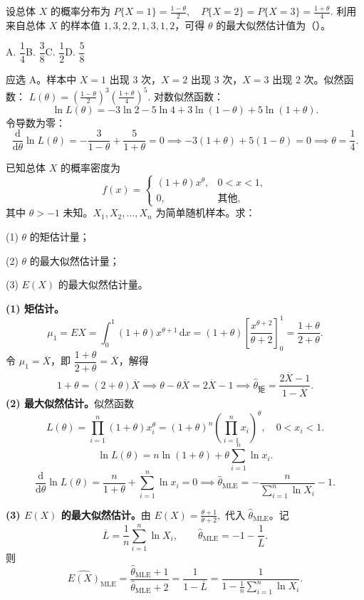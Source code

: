 \documentclass[lang=cn,11pt]{elegantbook}
\begin{document}
\begin{exercise}[离散分布的最大似然估计] \label{ex:mle_01}
设总体 \(X\) 的概率分布为
\(
P\{X=1\}=\frac{1-\theta}{2},\quad P\{X=2\}=P\{X=3\}=\frac{1+\theta}{4}.
\)
利用来自总体 \(X\) 的样本值 \(1,3,2,2,1,3,1,2\)，可得 \(\theta\) 的最大似然估计值为（\quad）。\par
A. \(\dfrac{1}{4}\)\qquad B. \(\dfrac{3}{8}\)\qquad C. \(\dfrac{1}{2}\)\qquad D. \(\dfrac{5}{8}\)
\end{exercise}
\begin{solution}
应选 A。样本中 \(X=1\) 出现 3 次，\(X=2\) 出现 3 次，\(X=3\) 出现 2 次。似然函数：
\(
L(\theta)=\left(\frac{1-\theta}{2}\right)^{\!3}\left(\frac{1+\theta}{4}\right)^{\!5}.
\)
对数似然函数：
\[
\ln L(\theta)=-3\ln 2-5\ln 4+3\ln(1-\theta)+5\ln(1+\theta).
\]
令导数为零：
\[
\frac{\mathrm{d}}{\mathrm{d}\theta}\ln L(\theta)=-\frac{3}{1-\theta}+\frac{5}{1+\theta}=0
\implies -3(1+\theta)+5(1-\theta)=0
\implies \theta=\frac{1}{4}.
\]
\end{solution}

\begin{exercise}[矩估计与最大似然估计]\label{ex:est_02}\label{exer:src-2017-201207-a-08-34credit}
已知总体 \(X\) 的概率密度为
\[
f(x)=
\begin{cases}
(1+\theta)x^\theta, & 0<x<1,\\
0, & \text{其他},
\end{cases}
\]
其中 \(\theta>-1\) 未知。\(X_1,X_2,\dots,X_n\) 为简单随机样本。求：\par
(1) \(\theta\) 的矩估计量；\par
(2) \(\theta\) 的最大似然估计量；\par
(3) \(E(X)\) 的最大似然估计量。
\end{exercise}
\begin{solution}
\textbf{(1) 矩估计。}
\[
\mu_1=EX=\int_0^1(1+\theta)x^{\theta+1}\,\mathrm{d}x=(1+\theta)\left[\frac{x^{\theta+2}}{\theta+2}\right]_0^1=\frac{1+\theta}{2+\theta}.
\]
令 \(\mu_1=\overline{X}\)，即 \(\dfrac{1+\theta}{2+\theta}=\overline{X}\)，解得
\[
1+\theta=(2+\theta)\overline{X}\implies \theta-\theta\overline{X}=2\overline{X}-1\implies \hat{\theta}_{\text{矩}}=\frac{2\overline{X}-1}{1-\overline{X}}.
\]
\textbf{(2) 最大似然估计。}似然函数
\[
L(\theta)=\prod_{i=1}^{n}(1+\theta)x_i^\theta=(1+\theta)^n\left(\prod_{i=1}^{n}x_i\right)^{\!\theta},\quad 0<x_i<1.
\]
\[
\ln L(\theta)=n\ln(1+\theta)+\theta\sum_{i=1}^{n}\ln x_i.
\]
\[
\frac{\mathrm{d}}{\mathrm{d}\theta}\ln L(\theta)=\frac{n}{1+\theta}+\sum_{i=1}^{n}\ln x_i=0
\implies \hat{\theta}_{\text{MLE}}=-\frac{n}{\displaystyle\sum_{i=1}^{n}\ln X_i}-1.
\]

\textbf{(3) \(E(X)\) 的最大似然估计。}由
\(
E(X)=\frac{\theta+1}{\theta+2},
\)
代入 \(\hat\theta_{\text{MLE}}\)。记
\[
\overline L=\frac1n\sum_{i=1}^n\ln X_i,
\qquad
\hat\theta_{\text{MLE}}=-1-\frac1{\overline L}.
\]
则
\[
\widehat{E(X)}_{\text{MLE}}
=\frac{\hat\theta_{\text{MLE}}+1}{\hat\theta_{\text{MLE}}+2}
=\frac{1}{1-\overline L}
=\frac{1}{1-\frac1n\sum_{i=1}^n\ln X_i}.
\]
\end{solution}
\end{document}
